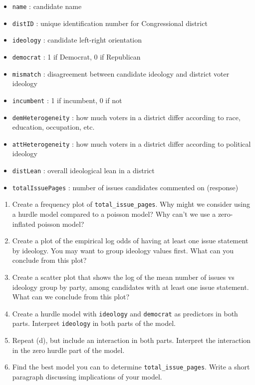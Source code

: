 \documentclass[
]{krantz}
\providecommand{\tightlist}{%
  \setlength{\itemsep}{0pt}\setlength{\parskip}{0pt}}
\begin{document}
\begin{itemize}
\tightlist
\item
  \texttt{name} : candidate name
\item
  \texttt{distID} : unique identification number for Congressional district
\item
  \texttt{ideology} : candidate left-right orientation
\item
  \texttt{democrat} : 1 if Democrat, 0 if Republican
\item
  \texttt{mismatch} : disagreement between candidate ideology and district voter ideology
\item
  \texttt{incumbent} : 1 if incumbent, 0 if not
\item
  \texttt{demHeterogeneity} : how much voters in a district differ according to race, education, occupation, etc.
\item
  \texttt{attHeterogeneity} : how much voters in a district differ according to political ideology
\item
  \texttt{distLean} : overall ideological lean in a district
\item
  \texttt{totalIssuePages} : number of issues candidates commented on (response)
\end{itemize}

\begin{enumerate}
\def\labelenumi{\alph{enumi}.}
\tightlist
\item
  Create a frequency plot of \texttt{total\_issue\_pages}. Why might we consider using a hurdle model compared to a poisson model? Why can't we use a zero-inflated poisson model?
\item
  Create a plot of the empirical log odds of having at least one issue statement by ideology. You may want to group ideology values first. What can you conclude from this plot?
\item
  Create a scatter plot that shows the log of the mean number of issues vs ideology group by party, among candidates with at least one issue statement. What can we conclude from this plot?
\item
  Create a hurdle model with \texttt{ideology} and \texttt{democrat} as predictors in both parts. Interpret \texttt{ideology} in both parts of the model.
\item
  Repeat (d), but include an interaction in both parts. Interpret the interaction in the zero hurdle part of the model.
\item
  Find the best model you can to determine \texttt{total\_issue\_pages}. Write a short paragraph discussing implications of your model.
\end{enumerate}
\end{document}
